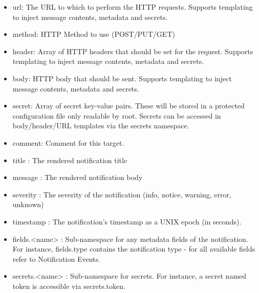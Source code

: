 \begin{itemize}[leftmargin=2cm]

	\item url: The URL to which to perform the HTTP requests. Supports templating to inject message contents, metadata and secrets.

	\item method: HTTP Method to use (POST/PUT/GET)

	\item header: Array of HTTP headers that should be set for the request. Supports templating to inject message contents, metadata and secrets.

	\item body: HTTP body that should be sent. Supports templating to inject message contents, metadata and secrets.

	\item secret: Array of secret key-value pairs. These will be stored in a protected configuration file only readable by root. Secrets can be accessed in body/header/URL templates via the secrets namespace.

	\item comment: Comment for this target.

\end{itemize}

\begin{itemize}[leftmargin=2cm]

	\item {{ title }}: The rendered notification title

	\item {{ message }}: The rendered notification body

	\item {{ severity }}: The severity of the notification (info, notice, warning, error, unknown)

	\item {{ timestamp }}: The notification’s timestamp as a UNIX epoch (in seconds).

	\item {{ fields.<name> }}: Sub-namespace for any metadata fields of the notification. For instance, fields.type contains the notification type - for all available fields refer to Notification Events.

	\item {{ secrets.<name> }}: Sub-namespace for secrets. For instance, a secret named token is accessible via secrets.token.

\end{itemize}

